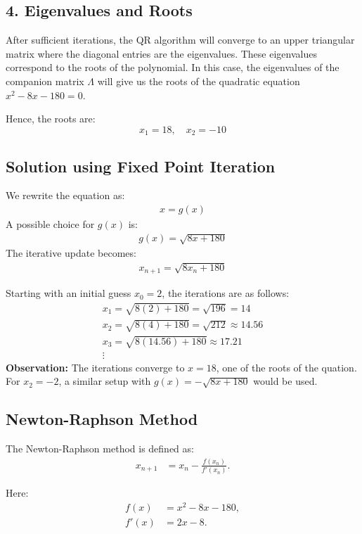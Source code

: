 \documentclass[journal]{IEEEtran}
\begin{document}
\subsection*{4. Eigenvalues and Roots}
After sufficient iterations, the QR algorithm will converge to an upper triangular matrix where the diagonal entries are the eigenvalues. These eigenvalues correspond to the roots of the polynomial. In this case, the eigenvalues of the companion matrix \( \Lambda \) will give us the roots of the quadratic equation \( x^2 -8x - 180 = 0 \).

Hence, the roots are:
\[
x_1 = 18, \quad x_2 = -10
\]

\subsection*{ Solution using Fixed Point Iteration}
We rewrite the equation as:
\begin{align}
    x = g(x)
\end{align}
A possible choice for \( g(x) \) is:
\begin{align}
    g(x) = \sqrt{8x + 180}
\end{align}
The iterative update becomes:
\begin{align}
    x_{n+1} = \sqrt{8x_n + 180}
\end{align}

Starting with an initial guess \( x_0 = 2 \), the iterations are as follows:
\begin{align}
    x_1 = \sqrt{8(2) + 180} = \sqrt{196} = 14 \\
    x_2 = \sqrt{8(4) + 180} = \sqrt{212} \approx 14.56 \\
    x_3 = \sqrt{8(14.56) + 180} \approx 17.21 \\
    \vdots
\end{align}
\textbf{Observation:} The iterations converge to \( x = 18 \), one of the roots of the quation. For \( x_2 = -2 \), a similar setup with \( g(x) = -\sqrt{8x + 180} \) would be used.

\subsection*{ Newton-Raphson Method}

The Newton-Raphson method is defined as:
\begin{align}
x_{n+1} &= x_n - \frac{f(x_n)}{f'(x_n)}. \tag{3.8}
\end{align}

Here:
\begin{align}
f(x) &= x^2 - 8x - 180, \nonumber \\
f'(x) &= 2x - 8. \tag{3.9}
\end{align}
\end{document}
